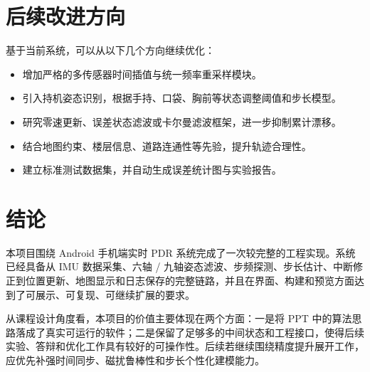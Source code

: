 \documentclass[12pt,a4paper]{ctexart}
\begin{document}
\section{后续改进方向}
基于当前系统，可以从以下几个方向继续优化：

\begin{itemize}
    \item 增加严格的多传感器时间插值与统一频率重采样模块。
    \item 引入持机姿态识别，根据手持、口袋、胸前等状态调整阈值和步长模型。
    \item 研究零速更新、误差状态滤波或卡尔曼滤波框架，进一步抑制累计漂移。
    \item 结合地图约束、楼层信息、道路连通性等先验，提升轨迹合理性。
    \item 建立标准测试数据集，并自动生成误差统计图与实验报告。
\end{itemize}

\section{结论}
本项目围绕 Android 手机端实时 PDR 系统完成了一次较完整的工程实现。系统已经具备从 IMU 数据采集、六轴 / 九轴姿态滤波、步频探测、步长估计、中断修正到位置更新、地图显示和日志保存的完整链路，并且在界面、构建和预览方面达到了可展示、可复现、可继续扩展的要求。

从课程设计角度看，本项目的价值主要体现在两个方面：一是将 PPT 中的算法思路落成了真实可运行的软件；二是保留了足够多的中间状态和工程接口，使得后续实验、答辩和优化工作具有较好的可操作性。后续若继续围绕精度提升展开工作，应优先补强时间同步、磁扰鲁棒性和步长个性化建模能力。
\end{document}
